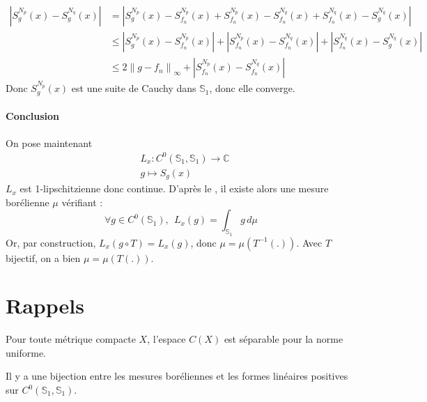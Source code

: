 \documentclass[11pt,a4paper]{article}
\begin{document}
\[
\begin{aligned}
|S^{N_p}_g (x) - S^{N_q}_g (x)| &= \left| S^{N_p}_g (x) - S^{N_p}_{f_n} (x) + S^{N_p}_{f_n} (x) - S^{N_q}_{f_n} (x) + S^{N_q}_{f_n} (x) - S^{N_q}_g (x) \right| \\
&\leq \left| S^{N_p}_g (x) - S^{N_p}_{f_n} (x) \right| + \left| S^{N_p}_{f_n} (x) - S^{N_q}_{f_n} (x) \right| + \left| S^{N_q}_{f_n} (x) - S^{N_q}_g (x) \right| \\
&\leq 2 \left\| g - f_n \right\|_\infty + \left| S^{N_p}_{f_n} (x) - S^{N_q}_{f_n} (x) \right|
\end{aligned}
\]
Donc $S^{N_p}_g (x)$ est une suite de Cauchy dans $\mathbb{S}_1$, donc elle converge.

\paragraph{Conclusion}
On pose maintenant 
\[
\begin{aligned}
&L_x: C^0(\mathbb{S}_1,\mathbb{S}_1) \to \mathbb{C} \\
&g \mapsto S_g(x)
\end{aligned}
\]
$L_x$ est 1-lipschitzienne donc continue. D'après le , il existe alors une mesure borélienne $\mu$ vérifiant :
\[
\forall g \in C^0(\mathbb{S}_1), \: \: L_x(g) = \int_{\mathbb{S}_1} g \, d\mu
\]
Or, par construction, $L_x(g \circ T) = L_x(g)$, donc $\mu = \mu(T^{-1}(.))$. Avec $T$ bijectif, on a bien $\mu = \mu(T(.))$.

\section*{Rappels}
\begin{mthm}{1}\label{foo}
Pour toute métrique compacte $X$, l'espace $C(X)$ est séparable pour la norme uniforme.
\end{mthm}

\begin{mthm}{2}\label{fooo}
Il y a une bijection entre les mesures boréliennes et les formes linéaires positives sur $C^0(\mathbb{S}_1,\mathbb{S}_1)$.
\end{mthm}


\newpage
\printbibliography[heading=bibintoc, title={Références}]
\end{document}
